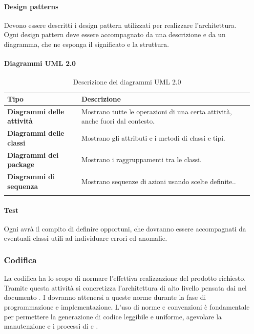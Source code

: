 \paragraph*{Design patterns}
Devono essere descritti i design pattern utilizzati per realizzare l'architettura. Ogni design pattern deve essere accompagnato da una descrizione e da un diagramma, che ne esponga il significato e la struttura.
\newpage
\paragraph*{Diagrammi UML 2.0}

{
\setlength{\freewidth}{\dimexpr\textwidth-0\tabcolsep}
	\renewcommand{\arraystretch}{1.5}
	\setlength{\aboverulesep}{0pt}
	\setlength{\belowrulesep}{0pt}
	\begin{longtable}{L{.210\freewidth} L{.6\freewidth} L{.080\freewidth}}
		\textbf{Tipo} & \textbf{Descrizione} \\
		\toprule
		\endhead		
		\textbf{Diagrammi delle attività} & Mostrano tutte le operazioni di una certa attività, anche fuori dal contesto. \\
		\textbf{Diagrammi delle classi} & Mostrano gli attributi e i metodi di classi e tipi.\\
		\textbf{Diagrammi dei package} & Mostrano i raggruppamenti tra le classi. \\
		\textbf{Diagrammi di sequenza} & Mostrano sequenze di azioni usando scelte definite.. \\
		\bottomrule
		\hiderowcolors
		\caption{Descrizione dei diagrammi UML 2.0}
	\end{longtable}
}
\paragraph*{Test}
Ogni \prog{} avrà il compito di definire  opportuni, che dovranno essere accompagnati da eventuali classi utili ad individuare errori ed anomalie.
\subsubsection{Codifica}
La codifica ha lo scopo di normare l'effettiva realizzazione del prodotto  richiesto. Tramite questa attività si concretizza l'architettura di alto livello pensata dai \progs{} nel documento \PdQ{}. I \progrs{} dovranno attenersi a queste norme durante la fase di programmazione e implementazione. L'uso di norme e convenzioni è fondamentale per permettere la generazione di codice leggibile e uniforme, agevolare la manutenzione e i processi di  e .
